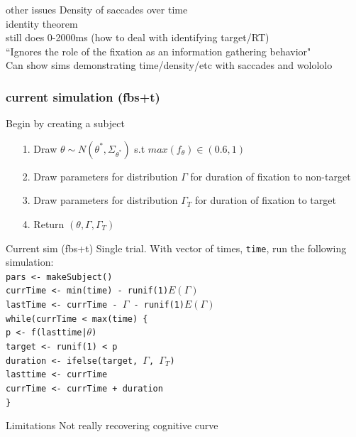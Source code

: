 \documentclass{beamer}
\newcommand{\code}[1]{\texttt{#1}}
\begin{document}
\begin{frame}{other issues}
Density of saccades over time \newline \\
identity theorem \newline \\
still does 0-2000ms (how to deal with identifying target/RT) \newline \\
``Ignores the role of the fixation as an information gathering behavior" \newline \\

Can show sims demonstrating time/density/etc with saccades and  wolololo
\end{frame}

\begin{frame}[fragile]
\frametitle{current simulation (fbs+t)}
Begin by creating a subject \newline \\

  \begin{enumerate}
  \item[1.] Draw $\theta \sim N(\theta^*, \Sigma_{\theta^*})$ s.t $max(f_{\theta}) \in (0.6, 1)$
  \item[2.] Draw parameters for distribution $\Gamma$ for duration of fixation to non-target
  \item[3.] Draw parameters for distribution $\Gamma_T$ for duration of fixation to target
  \item[4.] Return $(\theta, \Gamma, \Gamma_T)$
  \end{enumerate}

\end{frame}

\begin{frame}{Current sim (fbs+t)}
Single trial. With vector of times, \code{time}, run the following simulation:\newline \\

\code{pars <- makeSubject()} \\
\code{currTime <- min(time) - runif(1)}$E(\Gamma)$ \\
\code{lastTime <- currTime - }$\Gamma$\code{ - runif(1)}$E(\Gamma)$\newline \\
\code{while(currTime < max(time) \{} \\
\hspace{4mm} \code{p <- f(lasttime|}$\theta$\code{)} \\
\hspace{4mm} \code{target <- runif(1) < p} \\
\hspace{4mm} \code{duration <- ifelse(target, }$\Gamma$\code{, }$\Gamma_T$\code{)} \\
\hspace{4mm} \code{lasttime <- currTime} \\
\hspace{4mm} \code{currTime <- currTime + duration} \\
\code{\}}
\end{frame}

\begin{frame}{Limitations}
Not really recovering cognitive curve \newline 

\end{frame}
\end{document}
